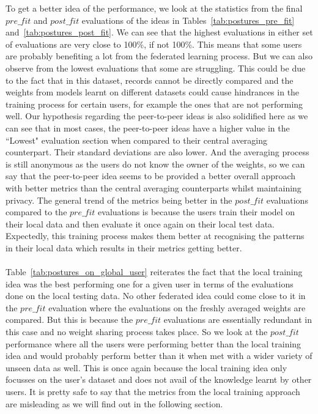 \documentclass[12pt]{article}
\begin{document}
\noindent To get a better idea of the performance, we look at the statistics from the final $pre\_fit$ and $post\_fit$ evaluations of the ideas in Tables~\ref{tab:postures_pre_fit} and~\ref{tab:postures_post_fit}. We can see that the highest evaluations in either set of evaluations are very close to 100\%, if not 100\%. This means that some users are probably benefiting a lot from the federated learning process. But we can also observe from the lowest evaluations that some are struggling. This could be due to the fact that in this dataset, records cannot be directly compared and the weights from models learnt on different datasets could cause hindrances in the training process for certain users, for example the ones that are not performing well. Our hypothesis regarding the peer-to-peer ideas is also solidified here as we can see that in most cases, the peer-to-peer ideas have a higher value in the ``Lowest" evaluation section when compared to their central averaging counterpart. Their standard deviations are also lower. And the averaging process is still anonymous as the users do not know the owner of the weights, so we can say that the peer-to-peer idea seems to be provided a better overall approach with better metrics than the central averaging counterparts whilst maintaining privacy. The general trend of the metrics being better in the $post\_fit$ evaluations compared to the $pre\_fit$ evaluations is because the users train their model on their local data and then evaluate it once again on their local test data. Expectedly, this training process makes them better at recognising the patterns in their local data which results in their metrics getting better. 
\\\\
Table~\ref{tab:postures_on_global_user} reiterates the fact that the local training idea was the best performing one for a given user in terms of the evaluations done on the local testing data. No other federated idea could come close to it in the $pre\_fit$ evaluation where the evaluations on the freshly averaged weights are compared. But this is because the $pre\_fit$ evaluations are essentially redundant in this case and no weight sharing process takes place. So we look at the $post\_fit$ performance where all the users were performing better than the local training idea and would probably perform better than it when met with a wider variety of unseen data as well. This is once again because the local training idea only focusses on the user's dataset and does not avail of the knowledge learnt by other users. It is pretty safe to say that the metrics from the local training approach are misleading as we will find out in the following section.
\end{document}
